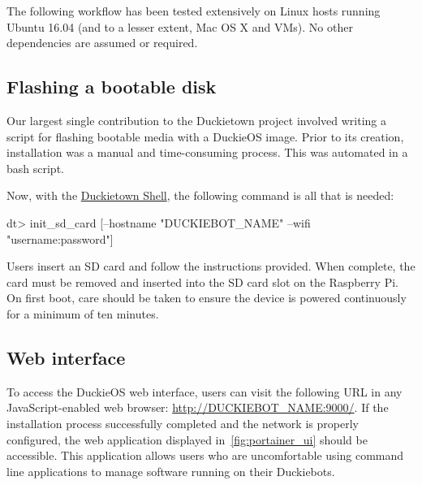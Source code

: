 \documentclass[12pt,initial,twoside,maitrise]{dms}
\numberwithin{equation}{section}
\numberwithin{table}{chapter}
\numberwithin{figure}{chapter}
\begin{document}
\noindent The following workflow has been tested extensively on Linux hosts running Ubuntu 16.04 (and to a lesser extent, Mac OS X and VMs). No other dependencies are assumed or required.

\subsection{Flashing a bootable disk}

Our largest single contribution to the Duckietown project involved writing a script for flashing bootable media with a DuckieOS image. Prior to its creation, installation was a manual and time-consuming process. This was automated in a bash script.

%
Now, with the \href{https://github.com/duckietown/duckietown-shell}{Duckietown Shell}, the following command is all that is needed:
%
\begin{dtslisting}
dt> init_sd_card [--hostname "DUCKIEBOT_NAME" --wifi "username:password"]
\end{dtslisting}
%
Users insert an SD card and follow the instructions provided. When complete, the card must be removed and inserted into the SD card slot on the Raspberry Pi. On first boot, care should be taken to ensure the device is powered continuously for a minimum of ten minutes.

\subsection{Web interface}

To access the DuckieOS web interface, users can visit the following URL in any JavaScript-enabled web browser: \url{http://DUCKIEBOT_NAME:9000/}. If the installation process successfully completed and the network is properly configured, the web application displayed in~\autoref{fig:portainer_ui} should be accessible. This application allows users who are uncomfortable using command line applications to manage software running on their Duckiebots.
\end{document}
